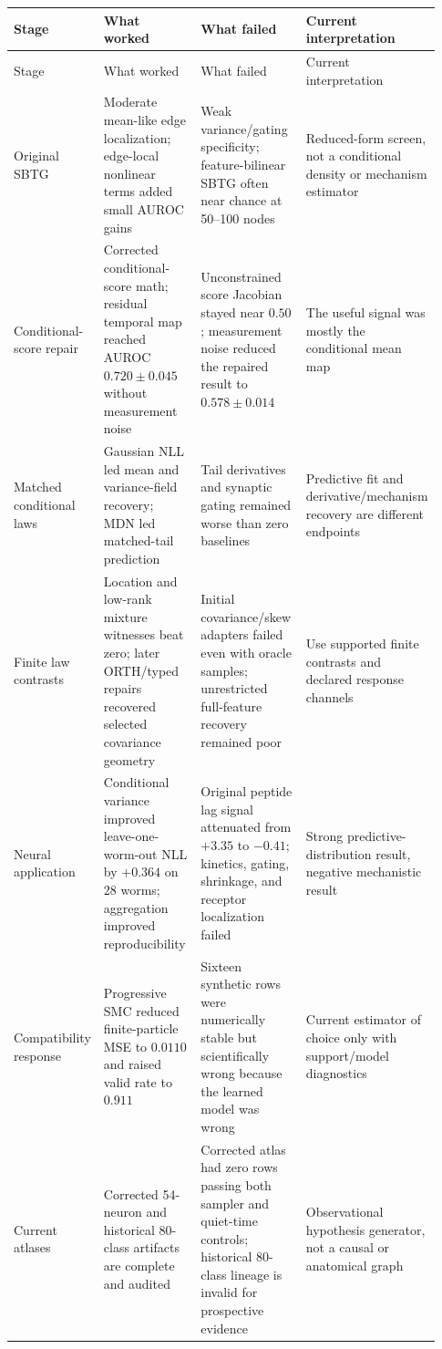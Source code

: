 \documentclass[10pt]{article}
\begin{document}
\begin{longtable}{L{0.19\linewidth}L{0.25\linewidth}L{0.27\linewidth}L{0.22\linewidth}}
\toprule
Stage & What worked & What failed & Current interpretation \\
\midrule
\endfirsthead
\toprule Stage & What worked & What failed & Current interpretation \\
\midrule
\endhead
Original SBTG & Moderate mean-like edge localization; edge-local nonlinear terms added small AUROC gains & Weak variance/gating specificity; feature-bilinear SBTG often near chance at 50--100 nodes & Reduced-form screen, not a conditional density or mechanism estimator \\
Conditional-score repair & Corrected conditional-score math; residual temporal map reached AUROC $0.720\pm0.045$ without measurement noise & Unconstrained score Jacobian stayed near $0.50$; measurement noise reduced the repaired result to $0.578\pm0.014$ & The useful signal was mostly the conditional mean map \\
Matched conditional laws & Gaussian NLL led mean and variance-field recovery; MDN led matched-tail prediction & Tail derivatives and synaptic gating remained worse than zero baselines & Predictive fit and derivative/mechanism recovery are different endpoints \\
Finite law contrasts & Location and low-rank mixture witnesses beat zero; later ORTH/typed repairs recovered selected covariance geometry & Initial covariance/skew adapters failed even with oracle samples; unrestricted full-feature recovery remained poor & Use supported finite contrasts and declared response channels \\
Neural application & Conditional variance improved leave-one-worm-out NLL by $+0.364$ on 28 worms; aggregation improved reproducibility & Original peptide lag signal attenuated from $+3.35$ to $-0.41$; kinetics, gating, shrinkage, and receptor localization failed & Strong predictive-distribution result, negative mechanistic result \\
Compatibility response & Progressive SMC reduced finite-particle MSE to $0.0110$ and raised valid rate to $0.911$ & Sixteen synthetic rows were numerically stable but scientifically wrong because the learned model was wrong & Current estimator of choice only with support/model diagnostics \\
Current atlases & Corrected 54-neuron and historical 80-class artifacts are complete and audited & Corrected atlas had zero rows passing both sampler and quiet-time controls; historical 80-class lineage is invalid for prospective evidence & Observational hypothesis generator, not a causal or anatomical graph \\
\bottomrule
\end{longtable}
\end{document}

